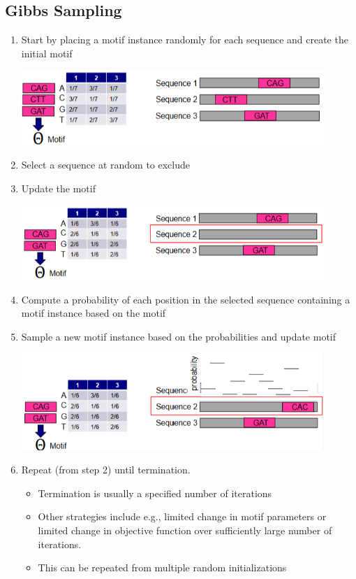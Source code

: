 \documentclass[10pt]{article}
\begin{document}
\subsection*{Gibbs Sampling}
\begin{enumerate}
    \item Start by placing a motif instance randomly for each sequence and create the initial motif
    \begin{center}
        \includegraphics*[width=0.9\textwidth]{W7_26.png}
    \end{center}
    \item Select a sequence at random to exclude
    \item Update the motif
    \begin{center}
        \includegraphics*[width=0.9\textwidth]{W7_27.png}
    \end{center}
    \item Compute a probability of each position in the selected sequence containing a motif instance based on the motif
    \item Sample a new motif instance based on the probabilities and update motif
    \begin{center}
        \includegraphics*[width=0.9\textwidth]{W7_28.png}
    \end{center}
    \item Repeat (from step 2) until termination.
    \begin{itemize}
        \item Termination is usually a specified number of iterations
        \item Other strategies include e.g., limited change in motif parameters or limited change in objective function over sufficiently large number of iterations.
        \item This can be repeated from multiple random initializations
    \end{itemize}
\end{enumerate}
\end{document}
